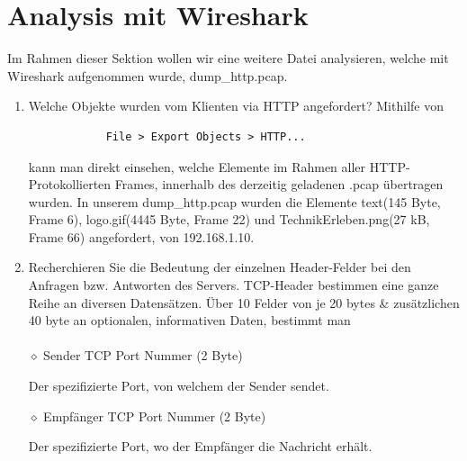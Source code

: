 \documentclass[11pt]{article}
\begin{document}
    \section{Analysis mit Wireshark}
    Im Rahmen dieser Sektion wollen wir eine weitere Datei analysieren, welche mit Wireshark aufgenommen wurde, dump\_http.pcap.
    \begin{enumerate}[\thesection .1]
        \item Welche Objekte wurden vom Klienten via HTTP angefordert?
        Mithilfe von
        \begin{verbatim}
            File > Export Objects > HTTP...
        \end{verbatim}
        kann man direkt einsehen, welche Elemente im Rahmen aller HTTP-Protokollierten Frames, innerhalb des derzeitig geladenen .pcap übertragen wurden.
        In unserem dump\_http.pcap wurden die Elemente text(145 Byte, Frame 6), logo.gif(4445 Byte, Frame 22) und TechnikErleben.png(27 kB, Frame 66) angefordert, von 192.168.1.10.

        \item Recherchieren Sie die Bedeutung der einzelnen Header-Felder bei den Anfragen bzw. Antworten des Servers.
        TCP-Header bestimmen eine ganze Reihe an diversen Datensätzen. Über 10 Felder von je 20 bytes \& zusätzlichen 40 byte
        an optionalen, informativen Daten, bestimmt man\\\\

        $\diamond$ Sender TCP Port Nummer (2 Byte)
        \begin{addmargin}[1em]{1em}
            Der spezifizierte Port, von welchem der Sender sendet.
        \end{addmargin}

        $\diamond$ Empfänger TCP Port Nummer (2 Byte)
        \begin{addmargin}[1em]{1em}
            Der spezifizierte Port, wo der Empfänger die Nachricht erhält.
        \end{addmargin}


\end{enumerate}
\end{document}
